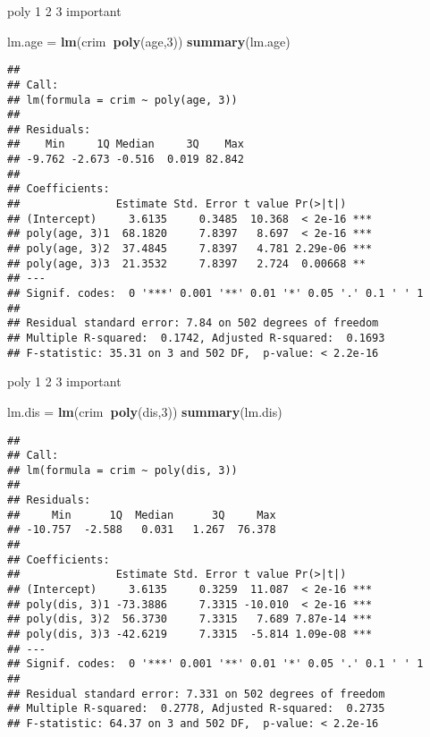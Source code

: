 \documentclass[]{article}
\newenvironment{Shaded}{\begin{snugshade}}{\end{snugshade}}
\newcommand{\DecValTok}[1]{\textcolor[rgb]{0.00,0.00,0.81}{#1}}
\newcommand{\KeywordTok}[1]{\textcolor[rgb]{0.13,0.29,0.53}{\textbf{#1}}}
\newcommand{\NormalTok}[1]{#1}
\newcommand{\OperatorTok}[1]{\textcolor[rgb]{0.81,0.36,0.00}{\textbf{#1}}}
\newcommand{\StringTok}[1]{\textcolor[rgb]{0.31,0.60,0.02}{#1}}
\begin{document}
poly 1 2 3 important

\begin{Shaded}
\begin{Highlighting}[]
\NormalTok{lm.age =}\StringTok{ }\KeywordTok{lm}\NormalTok{(crim}\OperatorTok{~}\KeywordTok{poly}\NormalTok{(age,}\DecValTok{3}\NormalTok{))}
\KeywordTok{summary}\NormalTok{(lm.age)}
\end{Highlighting}
\end{Shaded}

\begin{verbatim}
## 
## Call:
## lm(formula = crim ~ poly(age, 3))
## 
## Residuals:
##    Min     1Q Median     3Q    Max 
## -9.762 -2.673 -0.516  0.019 82.842 
## 
## Coefficients:
##               Estimate Std. Error t value Pr(>|t|)    
## (Intercept)     3.6135     0.3485  10.368  < 2e-16 ***
## poly(age, 3)1  68.1820     7.8397   8.697  < 2e-16 ***
## poly(age, 3)2  37.4845     7.8397   4.781 2.29e-06 ***
## poly(age, 3)3  21.3532     7.8397   2.724  0.00668 ** 
## ---
## Signif. codes:  0 '***' 0.001 '**' 0.01 '*' 0.05 '.' 0.1 ' ' 1
## 
## Residual standard error: 7.84 on 502 degrees of freedom
## Multiple R-squared:  0.1742, Adjusted R-squared:  0.1693 
## F-statistic: 35.31 on 3 and 502 DF,  p-value: < 2.2e-16
\end{verbatim}

poly 1 2 3 important

\begin{Shaded}
\begin{Highlighting}[]
\NormalTok{lm.dis =}\StringTok{ }\KeywordTok{lm}\NormalTok{(crim}\OperatorTok{~}\KeywordTok{poly}\NormalTok{(dis,}\DecValTok{3}\NormalTok{))}
\KeywordTok{summary}\NormalTok{(lm.dis)}
\end{Highlighting}
\end{Shaded}

\begin{verbatim}
## 
## Call:
## lm(formula = crim ~ poly(dis, 3))
## 
## Residuals:
##     Min      1Q  Median      3Q     Max 
## -10.757  -2.588   0.031   1.267  76.378 
## 
## Coefficients:
##               Estimate Std. Error t value Pr(>|t|)    
## (Intercept)     3.6135     0.3259  11.087  < 2e-16 ***
## poly(dis, 3)1 -73.3886     7.3315 -10.010  < 2e-16 ***
## poly(dis, 3)2  56.3730     7.3315   7.689 7.87e-14 ***
## poly(dis, 3)3 -42.6219     7.3315  -5.814 1.09e-08 ***
## ---
## Signif. codes:  0 '***' 0.001 '**' 0.01 '*' 0.05 '.' 0.1 ' ' 1
## 
## Residual standard error: 7.331 on 502 degrees of freedom
## Multiple R-squared:  0.2778, Adjusted R-squared:  0.2735 
## F-statistic: 64.37 on 3 and 502 DF,  p-value: < 2.2e-16
\end{verbatim}
\end{document}
